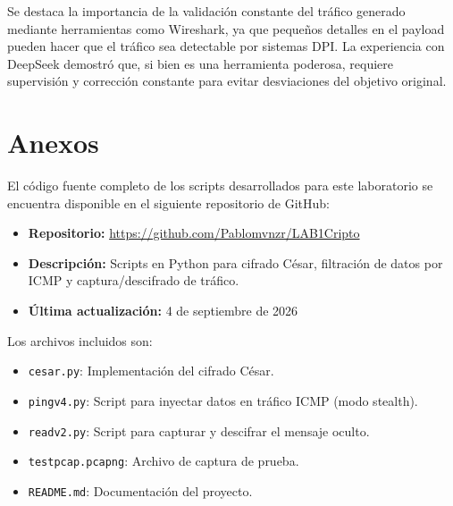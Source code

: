 \documentclass[letter,12pt]{article}
\begin{document}
Se destaca la importancia de la validación constante del tráfico generado mediante herramientas como Wireshark, ya que pequeños detalles en el payload pueden hacer que el tráfico sea detectable por sistemas DPI. La experiencia con DeepSeek demostró que, si bien es una herramienta poderosa, requiere supervisión y corrección constante para evitar desviaciones del objetivo original.

\section{Anexos}

El código fuente completo de los scripts desarrollados para este laboratorio se encuentra disponible en el siguiente repositorio de GitHub:

\begin{itemize}
    \item \textbf{Repositorio:} \url{https://github.com/Pablomvnzr/LAB1Cripto}
    \item \textbf{Descripción:} Scripts en Python para cifrado César, filtración de datos por ICMP y captura/descifrado de tráfico.
    \item \textbf{Última actualización:} 4 de septiembre de 2026
\end{itemize}

Los archivos incluidos son:
\begin{itemize}
    \item \texttt{cesar.py}: Implementación del cifrado César.
    \item \texttt{pingv4.py}: Script para inyectar datos en tráfico ICMP (modo stealth).
    \item \texttt{readv2.py}: Script para capturar y descifrar el mensaje oculto.
    \item \texttt{testpcap.pcapng}: Archivo de captura de prueba.
    \item \texttt{README.md}: Documentación del proyecto.
\end{itemize}
\end{document}
